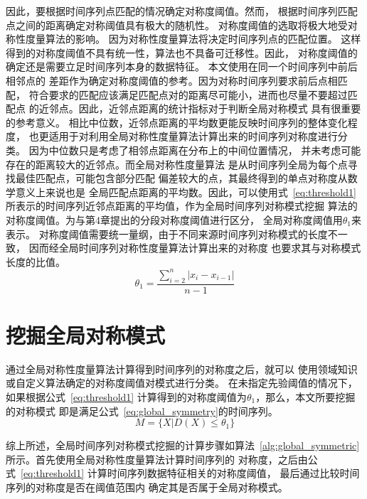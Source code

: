因此，要根据时间序列点匹配的情况确定对称度阈值。然而，
根据时间序列匹配点之间的距离确定对称阈值具有极大的随机性。
对称度阈值的选取将极大地受对称性度量算法的影响。
因为对称性度量算法将决定时间序列点的匹配位置。
这样得到的对称度阈值不具有统一性，算法也不具备可迁移性。因此，
对称度阈值的确定还是需要立足时间序列本身的数据特征。
本文使用在同一个时间序列中前后相邻点的
差距作为确定对称度阈值的参考。因为对称时间序列要求前后点相匹配，
符合要求的匹配应该满足匹配点对的距离尽可能小，进而也尽量不要超过匹配点
的近邻点。因此，近邻点距离的统计指标对于判断全局对称模式
具有很重要的参考意义。
相比中位数，近邻点距离的平均数更能反映时间序列的整体变化程度，
也更适用于对利用全局对称性度量算法计算出来的时间序列对称度进行分类。
因为中位数只是考虑了相邻点距离在分布上的中间位置情况，
并未考虑可能存在的距离较大的近邻点。而全局对称性度量算法
是从时间序列全局为每个点寻找最佳匹配点，可能包含部分匹配
偏差较大的点，其最终得到的单点对称度从数学意义上来说也是
全局匹配点距离的平均数。因此，可以使用式~\ref{eq:threshold1}
所表示的时间序列近邻点距离的平均值，作为全局时间序列对称模式挖掘
算法的对称度阈值。为与第4章提出的分段对称度阈值进行区分，
全局对称度阈值用$\theta_1$来表示。
对称度阈值需要统一量纲，由于不同来源时间序列对称模式的长度不一致，
因而经全局时间序列对称性度量算法计算出来的对称度
也要求其与对称模式长度的比值。
\begin{equation}
  \theta_{1}=\frac{\sum_{i=2}^{n}\left|x_{i}-x_{i-1}\right|}{n-1}
  \label{eq:threshold1}
\end{equation}

\section{挖掘全局对称模式}
通过全局对称性度量算法计算得到时间序列的对称度之后，就可以
使用领域知识或自定义算法确定的对称度阈值对模式进行分类。
在未指定先验阈值的情况下，如果根据公式~\ref{eq:threshold1}
计算得到的对称度阈值为$\theta_1$，那么，本文所要挖掘的对称模式
即是满足公式~\ref{eq:global_symmetry}的时间序列。
\begin{equation}
  M = \{X|D(X)\leq\theta_1\}
  \label{eq:global_symmetry}
\end{equation}

综上所述，全局时间序列对称模式挖掘的计算步骤如算法~\ref{alg:global_symmetric}
所示。首先使用全局对称性度量算法计算时间序列的
对称度，之后由公式~\ref{eq:threshold1}
计算时间序列数据特征相关的对称度阈值，
最后通过比较时间序列的对称度是否在阈值范围内
确定其是否属于全局对称模式。

